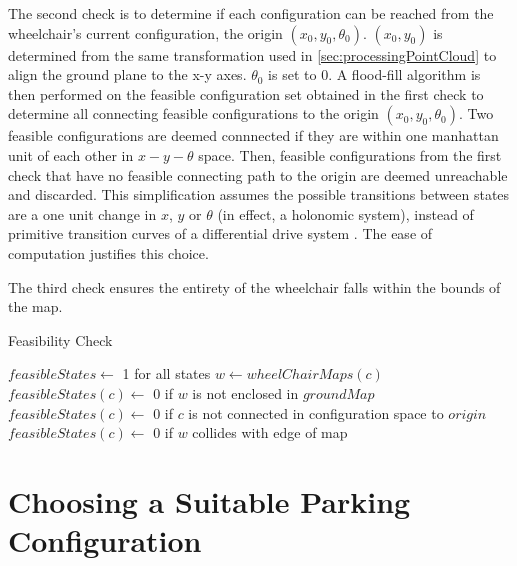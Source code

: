 The second check is to determine if each configuration can be reached from the
wheelchair's current configuration, the origin $(x_0,y_0,\theta_0)$. $(x_0,y_0)$
is determined from the same transformation used in
\autoref{sec:processingPointCloud} to align the ground plane to the x-y axes.
$\theta_0$ is set to $0$. A flood-fill algorithm is then performed on the
feasible configuration set obtained in the first check to determine all connecting
feasible configurations to the origin $(x_0,y_0,\theta_0)$. Two feasible
configurations are deemed connnected if they are within one manhattan unit of
each other in $x-y-\theta$ space.
Then, feasible configurations from the first check that have no feasible
connecting path to the origin are deemed unreachable and discarded. 
This simplification assumes the possible transitions between states are a one
unit change in $x$, $y$ or $\theta$ (in effect, a holonomic system), instead of
primitive transition curves of a differential drive system
\cite{balkcom2002time}. The ease of computation justifies this choice.


The third check ensures the entirety of the wheelchair falls within the bounds
of the map.

\begin{algorithm}
\caption{Feasibility Check}
\label{alg:feasibilitycheck}
\begin{algorithmic}[1]
\Statex
{}
    \State $feasibleStates \gets$ 1 for all states
        \State $w \gets wheelChairMaps(c)$
        \State $feasibleStates(c) \gets$ 0 if $w$ is not enclosed in $groundMap$
        \State $feasibleStates(c) \gets$ 0 if $c$ is not connected in configuration space to $origin$
        \State $feasibleStates(c) \gets$ 0 if $w$ collides with edge of map
    \EndFor
\EndFunction
\Statex
{}
\end{algorithmic}
\end{algorithm}

\section{Choosing a Suitable Parking Configuration}
\label{sec:choosingparkingspot}

